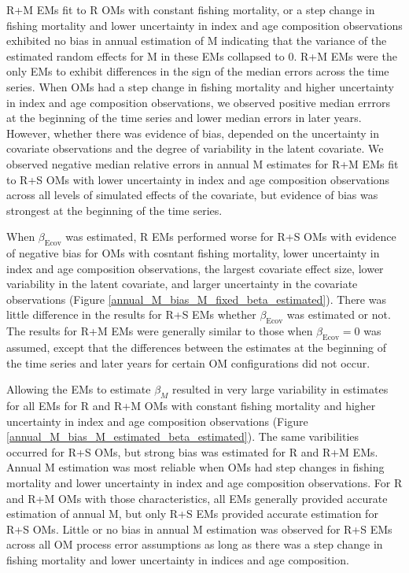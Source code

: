 \documentclass[
  12pt,
]{article}
\begin{document}
R+M EMs fit to R OMs with constant fishing mortality, or a step change
in fishing mortality and lower uncertainty in index and age composition
observations exhibited no bias in annual estimation of M indicating that
the variance of the estimated random effects for M in these EMs
collapsed to 0. R+M EMs were the only EMs to exhibit differences in the
sign of the median errors across the time series. When OMs had a step
change in fishing mortality and higher uncertainty in index and age
composition observations, we observed positive median errrors at the
beginning of the time series and lower median errors in later years.
However, whether there was evidence of bias, depended on the uncertainty
in covariate observations and the degree of variability in the latent
covariate. We observed negative median relative errors in annual M
estimates for R+M EMs fit to R+S OMs with lower uncertainty in index and
age composition observations across all levels of simulated effects of
the covariate, but evidence of bias was strongest at the beginning of
the time series.

When \(\beta_\text{Ecov}\) was estimated, R EMs performed worse for R+S
OMs with evidence of negative bias for OMs with cosntant fishing
mortality, lower uncertainty in index and age composition observations,
the largest covariate effect size, lower variability in the latent
covariate, and larger uncertainty in the covariate observations (Figure
\ref{annual_M_bias_M_fixed_beta_estimated}). There was little difference
in the results for R+S EMs whether \(\beta_\text{Ecov}\) was estimated
or not. The results for R+M EMs were generally similar to those when
\(\beta_\text{Ecov}=0\) was assumed, except that the differences between
the estimates at the beginning of the time series and later years for
certain OM configurations did not occur.

Allowing the EMs to estimate \(\beta_M\) resulted in very large
variability in estimates for all EMs for R and R+M OMs with constant
fishing mortality and higher uncertainty in index and age composition
observations (Figure \ref{annual_M_bias_M_estimated_beta_estimated}).
The same varibilities occurred for R+S OMs, but strong bias was
estimated for R and R+M EMs. Annual M estimation was most reliable when
OMs had step changes in fishing mortality and lower uncertainty in index
and age composition observations. For R and R+M OMs with those
characteristics, all EMs generally provided accurate estimation of
annual M, but only R+S EMs provided accurate estimation for R+S OMs.
Little or no bias in annual M estimation was observed for R+S EMs across
all OM process error assumptions as long as there was a step change in
fishing mortality and lower uncertainty in indices and age composition.
\end{document}
